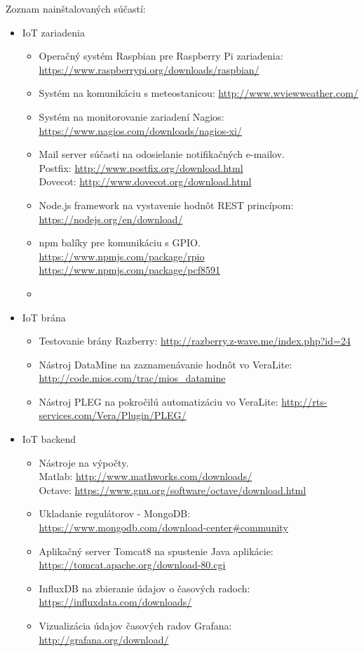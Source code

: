 Zoznam nainštalovaných súčastí:
\begin{itemize}
\item IoT zariadenia
  \begin{itemize}
    \item Operačný systém Raspbian pre Raspberry Pi zariadenia: \url{https://www.raspberrypi.org/downloads/raspbian/}
    \item Systém na komunikáciu s meteostanicou: \url{http://www.wviewweather.com/}    
    \item Systém na monitorovanie zariadení Nagios: \url{https://www.nagios.com/downloads/nagios-xi/}
    \item Mail server súčasti na odosielanie notifikačných e-mailov. \\
Postfix: \url{http://www.postfix.org/download.html} \\
Dovecot: \url{http://www.dovecot.org/download.html}
    \item Node.js framework na vystavenie hodnôt REST princípom: \url{https://nodejs.org/en/download/}
    \item npm balíky pre komunikáciu s GPIO. \\
\url{https://www.npmjs.com/package/rpio} \\
\url{https://www.npmjs.com/package/pcf8591}
	\item
  \end{itemize}
\item IoT brána
  \begin{itemize}
    \item Testovanie brány Razberry: \url{http://razberry.z-wave.me/index.php?id=24}
    \item Nástroj DataMine na zaznamenávanie hodnôt vo VeraLite: \url{http://code.mios.com/trac/mios_datamine} 
    \item Nástroj PLEG na pokročilú automatizáciu vo VeraLite: \url{http://rts-services.com/Vera/Plugin/PLEG/} 
  \end{itemize}   
\item IoT backend
  \begin{itemize}
    \item Nástroje na výpočty.\\
Matlab: \url{http://www.mathworks.com/downloads/} \\
Octave: \url{https://www.gnu.org/software/octave/download.html}    
    \item Ukladanie regulátorov - MongoDB: \url{https://www.mongodb.com/download-center#community}
    \item Aplikačný server Tomcat8 na spustenie Java aplikácie: \url{https://tomcat.apache.org/download-80.cgi}
    \item InfluxDB na zbieranie údajov o časových radoch: \url{https://influxdata.com/downloads/}
    \item Vizualizácia údajov časových radov Grafana: \url{http://grafana.org/download/}
  \end{itemize}
\end{itemize}